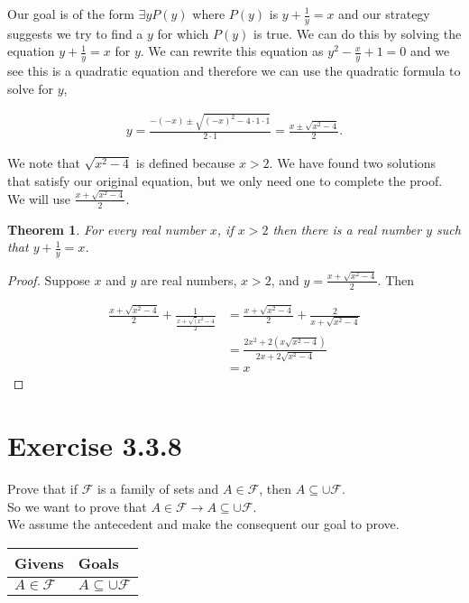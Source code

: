 \documentclass{article}
\newcommand{\n}{ \noindent }
\newcommand{\F}{\mathcal{F}}
\newtheorem*{theorem}{Theorem}  %
\begin{document}
\n Our goal is of the form $\exists y P(y)$ where $P(y)$ is $y + \tfrac{1}{y} = x$ and our strategy suggests we try to find a $y$ for which $P(y)$ is true. We can do this by solving the equation $y + \tfrac{1}{y} = x$ for $y$. We can rewrite this equation as $y^2 - \tfrac{x}{y} + 1 = 0$ and we see this is a quadratic equation and therefore we can use the quadratic formula to solve for $y$,



\begin{align*}
y = \frac{-(-x) \pm \sqrt{(-x)^2 - 4\cdot1\cdot1}}{2 \cdot 1} = \frac{x \pm \sqrt{x^2 - 4}}{2} \text{.}
\end{align*}

\n We note that $\sqrt{x^2 - 4}$ is defined because $x>2$. We have found two solutions that satisfy our original equation, but we only need one to complete the proof. We will use $\tfrac{x + \sqrt{x^2 - 4}}{2}$.

\begin{theorem} For every real number $x$, if $x>2$ then there is a real number $y$ such that $y + \tfrac{1}{y} = x$.
\end{theorem}
\begin{proof}
Suppose $x$ and $y$ are real numbers, $x>2$, and $y = \tfrac{x + \sqrt{x^2 - 4}}{2}$. Then

\begin{align*}
\frac{x + \sqrt{x^2 -4}}{2} + \frac{1}{ \frac{x + \sqrt(x^2 - 4}{2}} &= \frac{x + \sqrt{x^2 - 4}}{2} + \frac{2}{x + \sqrt{x^2 - 4}} \\
&= \frac{2x^2 + 2(x\sqrt{x^2 - 4})}{2x + 2\sqrt{x^2-4}} \\
&= x 
\end{align*}

\end{proof}

\section*{Exercise 3.3.8}
\n Prove that if $\F$ is a family of sets and $A \in \F$, then $A \subseteq \cup \F$. \\

\n So we want to prove that
$ A \in \F \rightarrow A \subseteq \cup \F$. \\

\n We assume the antecedent and make the consequent our goal to prove. \\

\begin{table}[h]
\begin{tabular}{ll}
\hline
Givens & Goals   \\ \hline
$ A \in \F$  & $A \subseteq \cup \F$   \\ \hline
\end{tabular}
\end{table}
\end{document}

